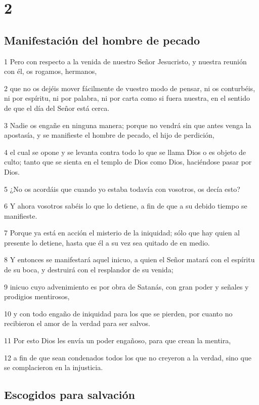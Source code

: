 \chapter{2}

\section*{Manifestación del hombre de pecado}

\par 1 Pero con respecto a la venida de nuestro Señor Jesucristo, y nuestra reunión con él, os rogamos, hermanos,
\par 2 que no os dejéis mover fácilmente de vuestro modo de pensar, ni os conturbéis, ni por espíritu, ni por palabra, ni por carta como si fuera nuestra, en el sentido de que el día del Señor está cerca.
\par 3 Nadie os engañe en ninguna manera; porque no vendrá sin que antes venga la apostasía, y se manifieste el hombre de pecado, el hijo de perdición,
\par 4 el cual se opone y se levanta contra todo lo que se llama Dios o es objeto de culto; tanto que se sienta en el templo de Dios como Dios, haciéndose pasar por Dios.
\par 5 ¿No os acordáis que cuando yo estaba todavía con vosotros, os decía esto?
\par 6 Y ahora vosotros sabéis lo que lo detiene, a fin de que a su debido tiempo se manifieste.
\par 7 Porque ya está en acción el misterio de la iniquidad; sólo que hay quien al presente lo detiene, hasta que él a su vez sea quitado de en medio.
\par 8 Y entonces se manifestará aquel inicuo, a quien el Señor matará con el espíritu de su boca, y destruirá con el resplandor de su venida;
\par 9 inicuo cuyo advenimiento es por obra de Satanás, con gran poder y señales y prodigios mentirosos,
\par 10 y con todo engaño de iniquidad para los que se pierden, por cuanto no recibieron el amor de la verdad para ser salvos.
\par 11 Por esto Dios les envía un poder engañoso, para que crean la mentira,
\par 12 a fin de que sean condenados todos los que no creyeron a la verdad, sino que se complacieron en la injusticia.

\section*{Escogidos para salvación}


